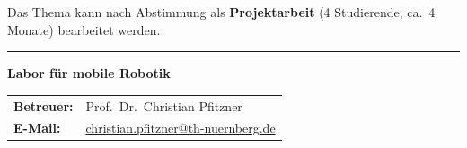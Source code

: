 \documentclass{ohm_project_description}
\begin{document}
\vspace{0.5cm}
Das Thema kann nach Abstimmung als \textbf{Projektarbeit} (4 Studierende, ca.\ 4 Monate)
bearbeitet werden.

\vfill
\textcolor{ohm_red}{\rule{\linewidth}{0.4mm}}
\textbf{\textcolor{ohm_red}{Labor für mobile Robotik}} \\
\begin{tabular}{@{}ll}
\textbf{Betreuer:} & Prof.\ Dr.\ Christian Pfitzner \\
\textbf{E-Mail:}   & \href{mailto:christian.pfitzner@th-nuernberg.de}{christian.pfitzner@th-nuernberg.de} \\
\end{tabular}
\end{document}
